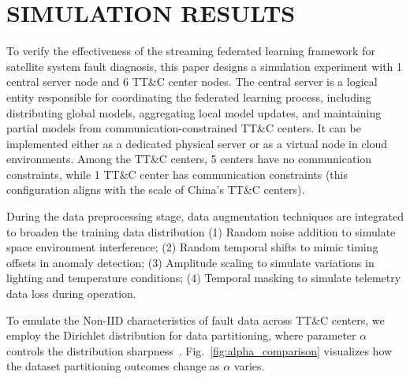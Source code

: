 \section{SIMULATION RESULTS}\label{sec:simulation-results}
To verify the effectiveness of the streaming federated learning framework for satellite system fault diagnosis, 
this paper designs a simulation experiment with 1 central server node and 6 TT\&C center nodes.
The central server is a logical entity responsible for coordinating the federated learning process, including distributing global models, aggregating local model updates, and maintaining partial models from communication-constrained TT\&C centers. It can be implemented either as a dedicated physical server or as a virtual node in cloud environments.
Among the TT\&C centers, 5 centers have no communication constraints, 
while 1 TT\&C center has communication constraints (this configuration aligns with the scale of China's TT\&C centers).

During the data preprocessing stage, 
data augmentation techniques are integrated to broaden the training data distribution 
(1) Random noise addition to simulate space environment interference;
(2) Random temporal shifts to mimic timing offsets in anomaly detection;
(3) Amplitude scaling to simulate variations in lighting and temperature conditions;
(4) Temporal masking to simulate telemetry data loss during operation.

To emulate the Non-IID characteristics of fault data across TT\&C centers, 
we employ the Dirichlet distribution for data partitioning, where parameter $\alpha$ controls the distribution sharpness~\cite{hsu2019measuring}. 
Fig.~\ref{fig:alpha_comparison} visualizes how the dataset partitioning outcomes change as $\alpha$ varies.

